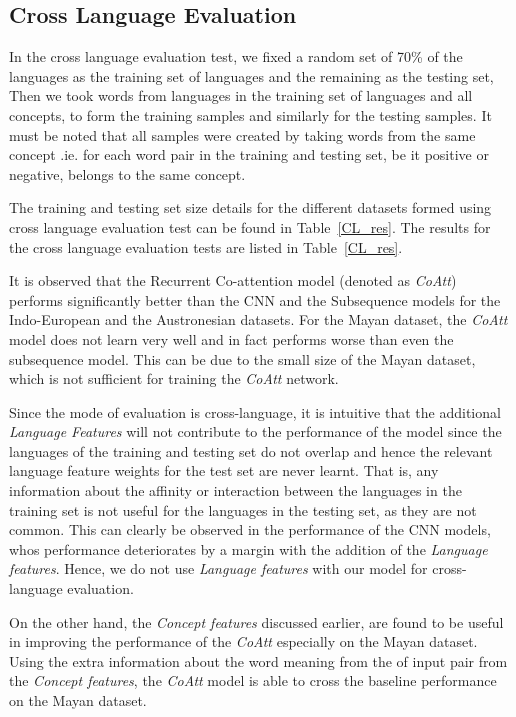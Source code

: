 \documentclass[11pt,letterpaper]{article}
\begin{document}
\subsection{Cross Language Evaluation}

In the cross language evaluation test, we fixed a random set of 70\% of the languages as the training set of languages and the remaining as the testing set, Then we took words from languages in the training set of languages and all concepts, to form the training samples and similarly for the testing samples. It must be noted that all samples were created by taking words from the same concept .ie. for each word pair in the training and testing set, be it positive or negative, belongs to the same concept.

The training and testing set size details for the different datasets formed using cross language evaluation test can be found in Table~\ref{CL_res}. The results for the cross language evaluation tests are listed in Table~\ref{CL_res}.

It is observed that the Recurrent Co-attention model (denoted as \textit{CoAtt}) performs significantly better than the CNN and the Subsequence models for the Indo-European and the Austronesian datasets. For the Mayan dataset, the \textit{CoAtt} model does not learn very well and in fact performs worse than even the subsequence model. This can be due to the small size of the Mayan dataset, which is not sufficient for training the \textit{CoAtt} network. 

Since the mode of evaluation is cross-language, it is intuitive that the additional \textit{Language Features} will not contribute to the performance of the model since the languages of the training and testing set do not overlap and hence the relevant language feature weights for the test set are never learnt. That is, any information about the affinity or interaction between the languages in the training set is not useful for the languages in the testing set, as they are not common. This can clearly be observed in the performance of the CNN models, whos performance deteriorates by a margin with the addition of the \textit{Language features}. Hence, we do not use \textit{Language features} with our model for cross-language evaluation.

On the other hand, the \textit{Concept features} discussed earlier, are found to be useful in improving the performance of the \textit{CoAtt} especially on the Mayan dataset. Using the extra information about the word meaning from the of input pair from the \textit{Concept features}, the \textit{CoAtt} model is able to cross the baseline performance on the Mayan dataset.
\end{document}
